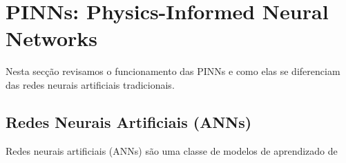 \section{PINNs: Physics-Informed Neural Networks}

Nesta
secção revisamos o funcionamento 
das PINNs e como elas se diferenciam das redes neurais artificiais tradicionais.

\subsection{Redes Neurais Artificiais (ANNs)}

Redes neurais artificiais (ANNs) são uma classe de modelos de aprendizado de 
